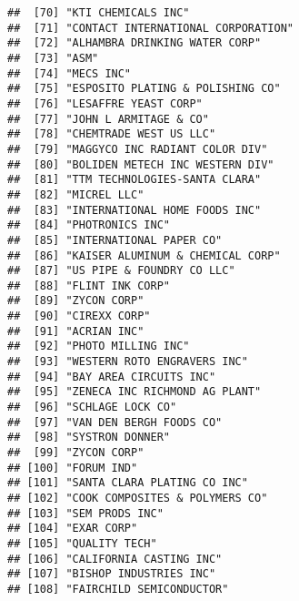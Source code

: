 \documentclass[
]{book}
\begin{document}
\begin{verbatim}
##  [70] "KTI CHEMICALS INC"                                       
##  [71] "CONTACT INTERNATIONAL CORPORATION"                       
##  [72] "ALHAMBRA DRINKING WATER CORP"                            
##  [73] "ASM"                                                     
##  [74] "MECS INC"                                                
##  [75] "ESPOSITO PLATING & POLISHING CO"                         
##  [76] "LESAFFRE YEAST CORP"                                     
##  [77] "JOHN L ARMITAGE & CO"                                    
##  [78] "CHEMTRADE WEST US LLC"                                   
##  [79] "MAGGYCO INC RADIANT COLOR DIV"                           
##  [80] "BOLIDEN METECH INC WESTERN DIV"                          
##  [81] "TTM TECHNOLOGIES-SANTA CLARA"                            
##  [82] "MICREL LLC"                                              
##  [83] "INTERNATIONAL HOME FOODS INC"                            
##  [84] "PHOTRONICS INC"                                          
##  [85] "INTERNATIONAL PAPER CO"                                  
##  [86] "KAISER ALUMINUM & CHEMICAL CORP"                         
##  [87] "US PIPE & FOUNDRY CO LLC"                                
##  [88] "FLINT INK CORP"                                          
##  [89] "ZYCON CORP"                                              
##  [90] "CIREXX CORP"                                             
##  [91] "ACRIAN INC"                                              
##  [92] "PHOTO MILLING INC"                                       
##  [93] "WESTERN ROTO ENGRAVERS INC"                              
##  [94] "BAY AREA CIRCUITS INC"                                   
##  [95] "ZENECA INC RICHMOND AG PLANT"                            
##  [96] "SCHLAGE LOCK CO"                                         
##  [97] "VAN DEN BERGH FOODS CO"                                  
##  [98] "SYSTRON DONNER"                                          
##  [99] "ZYCON CORP"                                              
## [100] "FORUM IND"                                               
## [101] "SANTA CLARA PLATING CO INC"                              
## [102] "COOK COMPOSITES & POLYMERS CO"                           
## [103] "SEM PRODS INC"                                           
## [104] "EXAR CORP"                                               
## [105] "QUALITY TECH"                                            
## [106] "CALIFORNIA CASTING INC"                                  
## [107] "BISHOP INDUSTRIES INC"                                   
## [108] "FAIRCHILD SEMICONDUCTOR"                                 

\end{verbatim}
\end{document}
